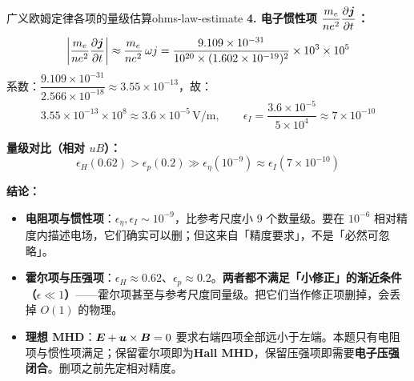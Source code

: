 \begin{example}{广义欧姆定律各项的量级估算}{ohms-law-estimate}
\textbf{4. 电子惯性项 $\dfrac{m_e}{ne^2}\dfrac{\partial\bm{j}}{\partial t}$：}
\[
\left|\frac{m_e}{ne^2}\frac{\partial\bm{j}}{\partial t}\right| \approx \frac{m_e}{ne^2}\,\omega j = \frac{9.109\times 10^{-31}}{10^{20}\times (1.602\times 10^{-19})^2}\times 10^3\times 10^5
\]
系数：$\dfrac{9.109\times 10^{-31}}{2.566\times 10^{-18}} \approx 3.55\times 10^{-13}$，故：
\[
3.55\times 10^{-13}\times 10^8 \approx 3.6\times 10^{-5}\,\mathrm{V/m},
\qquad \epsilon_I = \frac{3.6\times10^{-5}}{5\times10^4} \approx 7\times10^{-10}
\]

\textbf{量级对比（相对 $uB$）：}
\[
\epsilon_H(0.62) > \epsilon_p(0.2) \gg \epsilon_\eta(10^{-9}) \approx \epsilon_I(7\times10^{-10})
\]

\textbf{结论：}
\begin{itemize}[leftmargin=*,itemsep=0pt]
\item \textbf{电阻项与惯性项}：$\epsilon_\eta,\epsilon_I\sim10^{-9}$，比参考尺度小 9 个数量级。要在 $10^{-6}$ 相对精度内描述电场，它们确实可以删；但这来自「精度要求」，不是「必然可忽略」。
\item \textbf{霍尔项与压强项}：$\epsilon_H\approx0.62$、$\epsilon_p\approx0.2$。\textbf{两者都不满足「小修正」的渐近条件（$\epsilon\ll1$）}——霍尔项甚至与参考尺度同量级。把它们当作修正项删掉，会丢掉 $O(1)$ 的物理。
\item \textbf{理想 MHD}：$\bm{E}+\bm{u}\times\bm{B}=0$ 要求右端四项全部远小于左端。本题只有电阻项与惯性项满足；保留霍尔项即为\textbf{Hall MHD}，保留压强项即需要\textbf{电子压强闭合}。删项之前先定相对精度。
\end{itemize}
\end{example}

